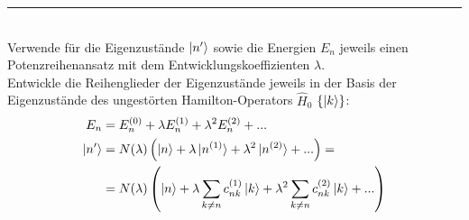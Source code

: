 \documentclass{article}
\newcommand{\lr}[1]{\left(#1\right)}
\begin{document}
{\color{violet}
\hrule
	\\
	Verwende für die Eigenzustände $\ket{n'}$ sowie die Energien $E_n$ jeweils einen Potenzreihenansatz mit dem Entwicklungskoeffizienten $\lambda$.\\
	 Entwickle die Reihenglieder der Eigenzustände jeweils in der Basis der Eigenzustände des ungestörten Hamilton-Operators $\hat{H}_0$ $\{\ket{k}\}$:
	\begin{align*}
		E_n &= E_n^{(0)} + \lambda E_n^{(1)} + \lambda^2 E_n^{(2)} + ... \\
		\ket{n'} &= N(\lambda) \lr{ \ket{n} + \lambda \ket{n^{(1)}} + \lambda^2 \ket{n^{(2)}} + ... } = \\
			&= N(\lambda) \lr{ \ket{n} + \lambda \sum_{k\neq n} c_{nk}^{(1)}\ket{k} + \lambda^2 \sum_{k\neq n} c_{nk}^{(2)}\ket{k} + ... }
	\end{align*}

}
\end{document}
